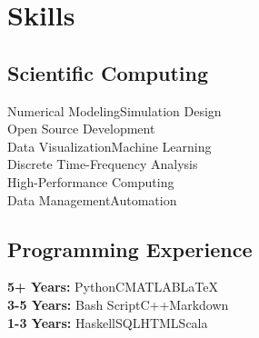 \documentclass[letterpaper]{deedy-resume} %
\begin{document}
\begin{minipage}[t]{0.32\textwidth}
\section{Skills}

%

\subsection{Scientific Computing}
Numerical Modeling\textbullet{}Simulation Design\\
\textbullet{}Open Source Development\\
\textbullet{}Data Visualization\textbullet{}Machine Learning\\
\textbullet{}Discrete Time-Frequency Analysis\\
\textbullet{}High-Performance Computing\\
\textbullet{}Data Management\textbullet{}Automation

\sectionspace

\subsection{Programming Experience}
\textbf{5+ Years:} Python\textbullet{}C\textbullet{}MATLAB\textbullet{}\LaTeX\\
\textbf{3-5 Years:} Bash Script\textbullet{}C++\textbullet{}Markdown\\
\textbf{1-3 Years:} Haskell\textbullet{}SQL\textbullet{}HTML\textbullet{}Scala


\end{minipage}
\end{document}
